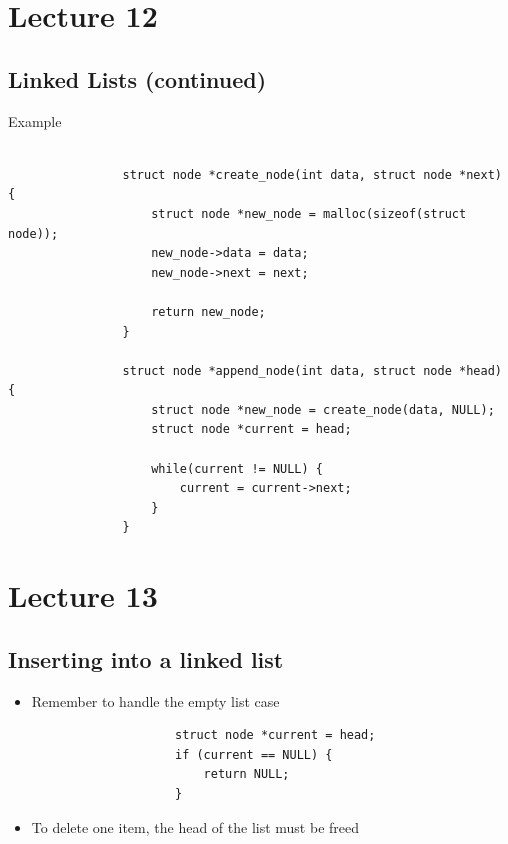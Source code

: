 \documentclass{article}
\begin{document}
\newpage

\section{Lecture 12}

	\subsection{Linked Lists (continued)}

		\begin{question}{Example}
			\begin{verbatim}
				
				struct node *create_node(int data, struct node *next) {
					struct node *new_node = malloc(sizeof(struct node));
					new_node->data = data;
					new_node->next = next;

					return new_node;
				}

				struct node *append_node(int data, struct node *head) {
					struct node *new_node = create_node(data, NULL);
					struct node *current = head;

					while(current != NULL) {
						current = current->next;
					}
				}

			\end{verbatim}
		\end{question}

\newpage

\section{Lecture 13}

	\subsection{Inserting into a linked list}

		\begin{itemize}
			\item Remember to handle the empty list case
				\begin{verbatim}
					struct node *current = head;
					if (current == NULL) {
						return NULL;
					}
				\end{verbatim}
			\item To delete one item, the head of the list must be freed
		\end{itemize}
\end{document}
